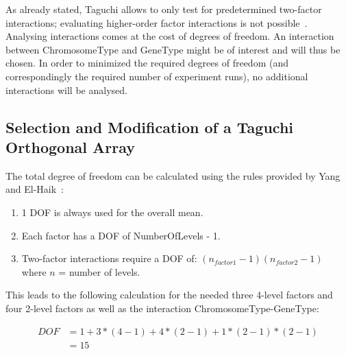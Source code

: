 As already stated, Taguchi allows to only test for predetermined two-factor interactions; evaluating higher-order factor interactions is not possible~\cite{yang_design_2009}. Analysing interactions comes at the cost of degrees of freedom. An interaction between ChromosomeType and GeneType might be of interest and will thus be chosen. In order to minimized the required degrees of freedom (and correspondingly the required number of experiment runs), no additional interactions will be analysed.

\subsection{Selection and Modification of a Taguchi Orthogonal Array}
\label{sect:hyperparameter_tuning:selection_orthogonal_array}
The total degree of freedom can be calculated using the rules provided by Yang and El-Haik~\cite{yang_design_2009}:

\begin{enumerate}
	\item 1 DOF is always used for the overall mean. 
	\item Each factor has a DOF of NumberOfLevels - 1.
	\item Two-factor interactions require a DOF of: $(n_{factor1} - 1)(n_{factor2} - 1)$ where $n$ = number of levels.
\end{enumerate}

This leads to the following calculation for the needed three 4-level factors and four 2-level factors as well as the interaction ChromosomeType-GeneType:

\begin{equation}
	\begin{split}
		DOF & = 1 + 3 * (4 - 1) + 4 * (2 - 1) + 1 * (2 - 1) * (2 - 1) \\
		& = 15
	\end{split}
	 \label{equ:hyperparam_tuning:DOF}
\end{equation}

